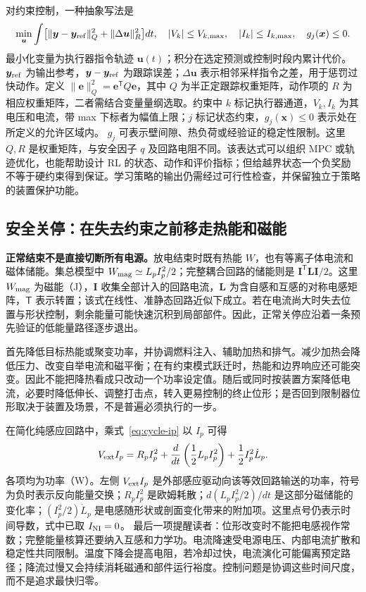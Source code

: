 \documentclass[12pt,fontset=none]{ctexart}
\numberwithin{equation}{section}
\numberwithin{table}{section}
\numberwithin{figure}{section}
\begin{document}
对约束控制，一种抽象写法是
\begin{equation}\label{eq:cycle-objective}
 \min_{\bm u}\int\bigl[\|\bm y-\bm y_{\rm ref}\|_Q^2+
 \|\Delta\bm u\|_R^2\bigr]dt,
 \quad |V_k|\leq V_{k,\max},\quad |I_k|\leq I_{k,\max},\quad g_j(\bm x)\leq0.
\end{equation}
最小化变量为执行器指令轨迹 $\bm u(t)$；积分在选定预测或控制时段内累计代价。$\bm y_{\rm ref}$ 为输出参考，$\bm y-\bm y_{\rm ref}$ 为跟踪误差；$\Delta\bm u$ 表示相邻采样指令之差，用于惩罚过快动作。定义 $\|\bm e\|_Q^2=\bm e^{\mathsf T}Q\bm e$，其中 $Q$ 为半正定跟踪权重矩阵，动作项的 $R$ 为相应权重矩阵，二者需结合变量量纲选取。约束中 $k$ 标记执行器通道，$V_k,I_k$ 为其电压和电流，带 max 下标者为幅值上限；$j$ 标记状态约束，$g_j(\bm x)\leq0$ 表示处在所定义的允许区域内。
$g_j$ 可表示壁间隙、热负荷或经验证的稳定性限制。这里 $Q,R$ 是权重矩阵，与安全因子 $q$ 及回路电阻不同。该表达式可以组织 MPC 或轨迹优化，也能帮助设计 RL 的状态、动作和评价指标；但给越界状态一个负奖励不等于硬约束得到保证。学习策略的输出仍需经过可行性检查，并保留独立于策略的装置保护功能。

\subsection{安全关停：在失去约束之前移走热能和磁能}\label{sec:cycle-shutdown}

\textbf{正常结束不是直接切断所有电源。}放电结束时既有热能 $W$，也有等离子体电流和磁体储能。集总模型中 $W_{\rm mag}\simeq L_pI_p^2/2$；完整耦合回路的储能则是 $\bm I^{\mathsf T}\bm L\bm I/2$。这里 $W_{\rm mag}$ 为磁能（J），$\bm I$ 收集全部计入的回路电流，$\bm L$ 为含自感和互感的对称电感矩阵，$\mathsf T$ 表示转置；该式在线性、准静态回路近似下成立。若在电流尚大时失去位置与形状控制，剩余能量可能快速沉积到局部部件。因此，正常关停应沿着一条预先验证的低能量路径逐步退出。

首先降低目标热能或聚变功率，并协调燃料注入、辅助加热和排气。减少加热会降低压力、改变自举电流和磁平衡；在有约束模式跃迁时，热能和边界响应还可能突变。因此不能把降热看成只改动一个功率设定值。随后或同时按装置方案降低电流，必要时降低伸长、调整打击点，转入更易控制的终止位形；是否回到限制器位形取决于装置及场景，不是普遍必须执行的一步。

在简化纯感应回路中，乘式~\eqref{eq:cycle-ip} 以 $I_p$ 可得
\begin{equation}\label{eq:cycle-shutdownenergy}
 V_{\rm ext}I_p=R_pI_p^2+
 \frac{d}{dt}\left(\frac12L_pI_p^2\right)+\frac12I_p^2\dot L_p.
\end{equation}
各项均为功率（W）。左侧 $V_{\rm ext}I_p$ 是外部感应驱动向该等效回路输送的功率，符号为负时表示反向能量交换；$R_pI_p^2$ 是欧姆耗散；$d(L_pI_p^2/2)/dt$ 是这部分磁储能的变化率；$(I_p^2/2)\dot L_p$ 是电感随形状或剖面变化带来的附加项。这里点号仍表示时间导数，式中已取 $I_{\rm NI}=0$。
最后一项提醒读者：位形改变时不能把电感视作常数；完整能量核算还要纳入互感和力学功。电流降速受电源电压、内部电流扩散和稳定性共同限制。温度下降会提高电阻，若冷却过快，电流演化可能偏离预定路径；降流过慢又会持续消耗磁通和部件运行裕度。控制问题是协调这些时间尺度，而不是追求最快归零。
\end{document}
